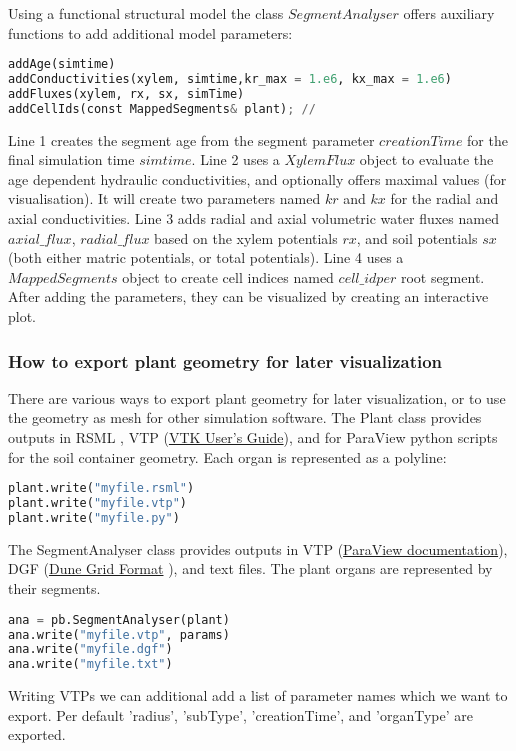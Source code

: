 Using a functional structural model the class $SegmentAnalyser$ offers auxiliary functions to add additional model parameters:
\begin{lstlisting}[language=Python]
addAge(simtime) 
addConductivities(xylem, simtime,kr_max = 1.e6, kx_max = 1.e6)
addFluxes(xylem, rx, sx, simTime)
addCellIds(const MappedSegments& plant); // 
\end{lstlisting}
Line 1 creates the segment age from the segment parameter $creationTime$ for the final simulation time $simtime$. Line 2 uses a $XylemFlux$ object to evaluate the age dependent hydraulic conductivities, and optionally offers maximal values (for visualisation). It will create two parameters named $kr$ and $kx$ for the radial and axial conductivities.  Line 3 adds radial and axial volumetric water fluxes named  $axial\_flux$, $radial\_flux$ based on the xylem potentials $rx$, and soil potentials $sx$ (both either matric potentials, or total potentials). Line 4 uses a $MappedSegments$ object to create cell indices named $cell\_id per$ root segment. After adding the parameters, they can be visualized by creating an interactive plot. 


\subsubsection*{How to export plant geometry for later visualization} \label{ssec:export}

There are various ways to export plant geometry for later visualization, or to use the geometry as mesh for other simulation software.
The Plant class provides outputs in RSML \citep{lobet2015root}, VTP (\href{https://vtk.org/vtk-users-guide/}{VTK User's Guide}), and for ParaView python scripts for the soil container geometry. Each organ is represented as a polyline:
\begin{lstlisting}[language=Python]
plant.write("myfile.rsml")
plant.write("myfile.vtp")
plant.write("myfile.py")
\end{lstlisting}

The SegmentAnalyser class provides outputs in VTP (\href{https://docs.paraview.org/en/latest/ReferenceManual/index.html}{ParaView documentation}), DGF (\href{https://dune-project.org/doxygen/2.4.1/group__DuneGridFormatParser.html}{Dune Grid Format} ), and text files. The plant organs are represented by their segments.
\begin{lstlisting}[language=Python]
ana = pb.SegmentAnalyser(plant)
ana.write("myfile.vtp", params)
ana.write("myfile.dgf")
ana.write("myfile.txt")
\end{lstlisting}
Writing VTPs we can additional add a list of parameter names which we want to export. Per default 'radius', 'subType', 'creationTime', and 'organType' are exported. 



